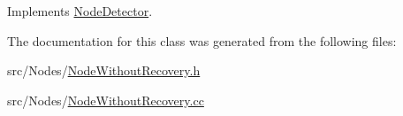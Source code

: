 Implements \hyperlink{classNodeDetector_a51e7dccd54e94bbe937752ca39dfdba4}{Node\+Detector}.



The documentation for this class was generated from the following files\+:\begin{DoxyCompactItemize}
\item 
src/\+Nodes/\hyperlink{NodeWithoutRecovery_8h}{Node\+Without\+Recovery.\+h}\item 
src/\+Nodes/\hyperlink{NodeWithoutRecovery_8cc}{Node\+Without\+Recovery.\+cc}\end{DoxyCompactItemize}
